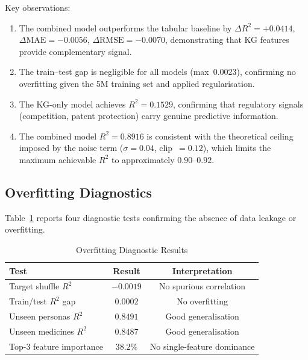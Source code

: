 \documentclass[10pt,journal,compsoc]{IEEEtran}
\begin{document}
Key observations:
\begin{enumerate}
  \item The combined model outperforms the tabular baseline by
        $\Delta R^2=+0.0414$, $\Delta\text{MAE}=-0.0056$, $\Delta\text{RMSE}=-0.0070$,
        demonstrating that KG features provide complementary signal.

  \item The train--test gap is negligible for all models (max~0.0023), confirming no
        overfitting given the 5M training set and applied regularisation.

  \item The KG-only model achieves $R^2=0.1529$, confirming that regulatory signals
        (competition, patent protection) carry genuine predictive information.

  \item The combined model $R^2=0.8916$ is consistent with the theoretical ceiling
        imposed by the noise term ($\sigma=0.04$, clip~$=0.12$), which limits the
        maximum achievable $R^2$ to approximately $0.90$--$0.92$.
\end{enumerate}

\subsection{Overfitting Diagnostics}

Table~\ref{tab:overfit_diag} reports four diagnostic tests confirming the absence of
data leakage or overfitting.

\begin{table}[!t]
\caption{Overfitting Diagnostic Results}
\label{tab:overfit_diag}
\centering
\begin{tabular}{lcc}
\toprule
\textbf{Test} & \textbf{Result} & \textbf{Interpretation} \\
\midrule
Target shuffle $R^2$        & $-0.0019$ & No spurious correlation \\
Train/test $R^2$ gap        & $0.0002$  & No overfitting \\
Unseen personas $R^2$       & $0.8491$  & Good generalisation \\
Unseen medicines $R^2$      & $0.8487$  & Good generalisation \\
Top-3 feature importance    & $38.2\%$  & No single-feature dominance \\
\bottomrule
\end{tabular}
\end{table}
\end{document}
